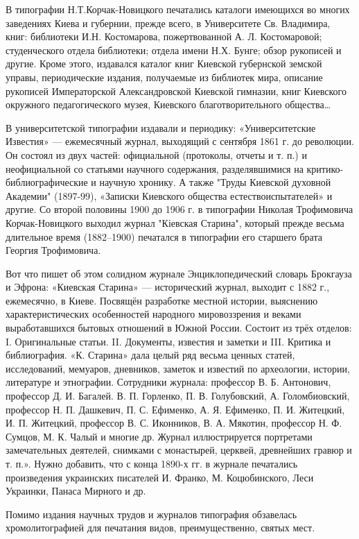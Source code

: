 В типографии Н.Т.Корчак-Новицкого печатались каталоги имеющихся во многих
заведениях Киева и губернии, прежде всего, в Университете Св. Владимира, книг:
библиотеки И.Н. Костомарова, пожертвованной А. Л. Костомаровой; студенческого
отдела библиотеки; отдела имени Н.Х. Бунге; обзор рукописей и другие. Кроме
этого, издавался каталог книг Киевской губернской земской управы, периодические
издания, получаемые из библиотек мира, описание рукописей Императорской
Александровской Киевской гимназии, книг Киевского окружного педагогического
музея, Киевского благотворительного общества…

В университетской типографии издавали и периодику: «Университетские Известия»
— ежемесячный журнал, выходящий с сентября 1861 г. до революции. Он состоял из
двух частей: официальной (протоколы, отчеты и т. п.) и неофициальной со
статьями научного содержания, разделявшимися на критико-библиографические и
научную хронику. А также "Труды Киевской духовной Академии" (1897-99), «Записки
Киевского общества естествоиспытателей» и другие. Со второй половины 1900 до
1906 г. в типографии Николая Трофимовича Корчак-Новицкого выходил журнал
"Кіевская Старина", который прежде весьма длительное время (1882–1900)
печатался в типографии его старшего брата Георгия Трофимовича.

Вот что пишет об этом солидном журнале Энциклопедический словарь Брокгауза и
Эфрона: «Киевская Старина» — исторический журнал, выходит с 1882 г.,
ежемесячно, в Киеве. Посвящён разработке местной истории, выяснению
характеристических особенностей народного мировоззрения и веками выработавшихся
бытовых отношений в Южной России. Состоит из трёх отделов: I. Оригинальные
статьи. II. Документы, известия и заметки и III. Критика и библиография. «К.
Старина» дала целый ряд весьма ценных статей, исследований, мемуаров,
дневников, заметок и известий по археологии, истории, литературе и этнографии.
Сотрудники журнала: профессор В. Б. Антонович, профессор Д. И. Багалей. В. П.
Горленко, П. В. Голубовский, А. Голомбиовский, профессор Н. П. Дашкевич, П. С.
Ефименко, А. Я. Ефименко, П. И. Житецкий, И. П. Житецкий, профессор В. С.
Иконников, В. А. Мякотин, профессор Н. Ф. Сумцов, М. К. Чалый и многие др.
Журнал иллюстрируется портретами замечательных деятелей, снимками с монастырей,
церквей, древнейших гравюр и т. п.». Нужно добавить, что с конца 1890-х гг. в
журнале печатались произведения украинских писателей И. Франко, М.
Коцюбинского, Леси Украинки, Панаса Мирного и др.

Помимо издания научных трудов и журналов типография обзавелась хромолитографией
для печатания видов, преимущественно, святых мест. 

